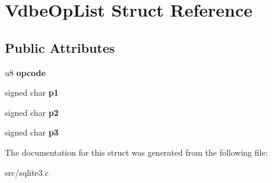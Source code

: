 \hypertarget{struct_vdbe_op_list}{\section{Vdbe\-Op\-List Struct Reference}
\label{struct_vdbe_op_list}
}
\subsection*{Public Attributes}
\begin{DoxyCompactItemize}
\item 
\hypertarget{struct_vdbe_op_list_a9c839a619aed99f91cb5e226487be7be}{u8 {\bfseries opcode}}\label{struct_vdbe_op_list_a9c839a619aed99f91cb5e226487be7be}

\item 
\hypertarget{struct_vdbe_op_list_a68641ef4313dfdfafe45b75203c49d5a}{signed char {\bfseries p1}}\label{struct_vdbe_op_list_a68641ef4313dfdfafe45b75203c49d5a}

\item 
\hypertarget{struct_vdbe_op_list_a8493431402f7f91cea81c00e311dc4e1}{signed char {\bfseries p2}}\label{struct_vdbe_op_list_a8493431402f7f91cea81c00e311dc4e1}

\item 
\hypertarget{struct_vdbe_op_list_a584cdaa02042fd5d1bc8cffbdfd9441d}{signed char {\bfseries p3}}\label{struct_vdbe_op_list_a584cdaa02042fd5d1bc8cffbdfd9441d}

\end{DoxyCompactItemize}


The documentation for this struct was generated from the following file\-:\begin{DoxyCompactItemize}
\item 
src/sqlite3.\-c\end{DoxyCompactItemize}
